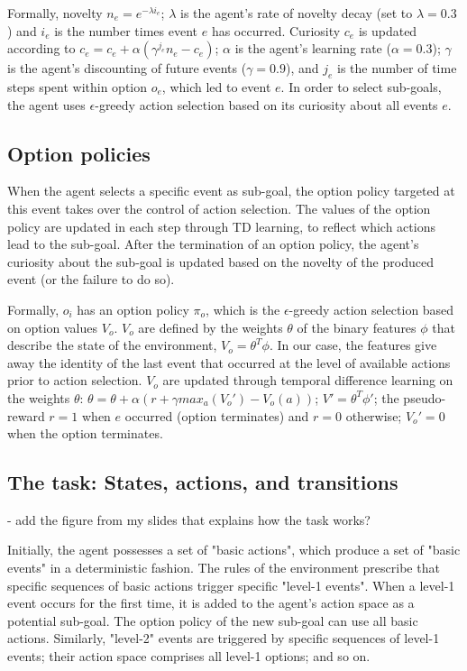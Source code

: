 \documentclass{article}
\begin{document}
Formally, novelty $n_e = e^{-\lambda i_e}$; $\lambda$ is the agent's rate of novelty decay (set to $\lambda = 0.3$) and $i_e$ is the number times event $e$ has occurred.
Curiosity $c_e$ is updated according to $c_e = c_e + \alpha (\gamma^{j_e} n_e - c_e)$; $\alpha$ is the agent's learning rate ($\alpha = 0.3$); $\gamma$ is the agent's discounting of future events ($\gamma = 0.9$), and $j_e$ is the number of time steps spent within option $o_e$, which led to event $e$.
In order to select sub-goals, the agent uses $\epsilon$-greedy action selection based on its curiosity about all events $e$.

\subsection{Option policies}

When the agent selects a specific event as sub-goal, the option policy targeted at this event takes over the control of action selection. The values of the option policy are updated in each step through TD learning, to reflect which actions lead to the sub-goal. After the termination of an option policy, the agent's curiosity about the sub-goal is updated based on the novelty of the produced event (or the failure to do so).

Formally, $o_i$ has an option policy $\pi_o$, which is the $\epsilon$-greedy action selection based on option values $V_o$. $V_o$ are defined by the weights $\theta$ of the binary features $\phi$ that describe the state of the environment, $V_o = \theta^T \phi$. In our case, the features give away the identity of the last event that occurred at the level of available actions prior to action selection.
$V_o$ are updated through temporal difference learning on the weights $\theta$: $\theta = \theta + \alpha (r + \gamma max_a(V_o') - V_o(a))$; $V' = \theta^T \phi'$; the pseudo-reward $r = 1$ when $e$ occurred (option terminates) and $r = 0$ otherwise; $V_o' = 0$ when the option terminates. 

\subsection{The task: States, actions, and transitions}

- add the figure from my slides that explains how the task works?

Initially, the agent possesses a set of "basic actions", which produce a set of "basic events" in a deterministic fashion. The rules of the environment prescribe that specific sequences of basic actions trigger specific "level-1 events". When a level-1 event occurs for the first time, it is added to the agent's action space as a potential sub-goal. The option policy of the new sub-goal can use all basic actions. Similarly, "level-2" events are triggered by specific sequences of level-1 events; their action space comprises all level-1 options; and so on.
\end{document}
